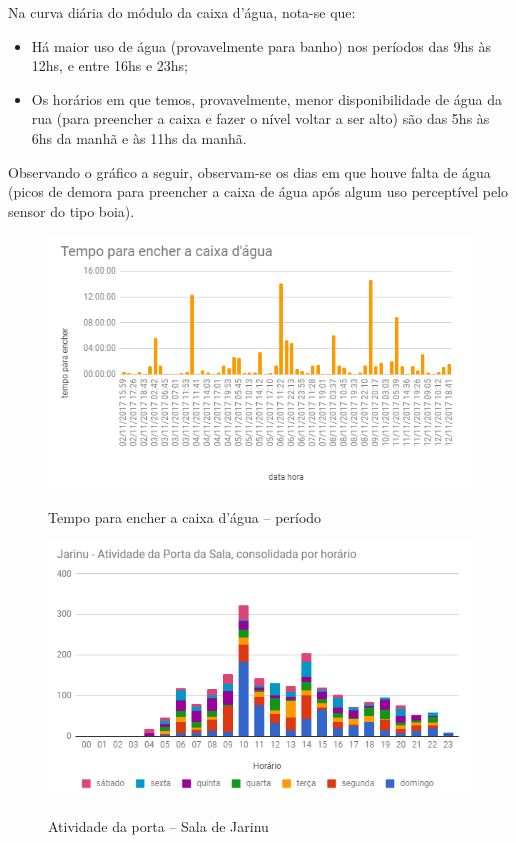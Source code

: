 Na curva diária do módulo da caixa d’água, nota-se que:

\begin{itemize}
	\item Há maior uso de água (provavelmente para banho) nos períodos das 9hs às 12hs, e entre 16hs e 23hs;
	\item Os horários em que temos, provavelmente, menor disponibilidade de água da rua (para preencher a caixa e fazer o nível voltar a ser alto) são das 5hs às 6hs da manhã e às 11hs da manhã.

\end{itemize}

Observando o gráfico a seguir, observam-se os dias em que houve falta de água (picos de demora para preencher a caixa de água após algum uso perceptível pelo sensor do tipo boia).

\begin{figure}[H]
	\centering
	\caption{Tempo para encher a caixa d'água -- período}
	\includegraphics[width=1.0\textwidth]{tempoPeriodocxAgua}
	\label{fig:tempoPeriodocxAgua}
\end{figure}

\begin{figure}[H]
	\centering
	\caption{Atividade da porta -- Sala de Jarinu}
	\includegraphics[width=1.0\textwidth]{AtivPortaSalaJarinu}
	\label{fig:AtivPortaSalaJarinu}
\end{figure}

